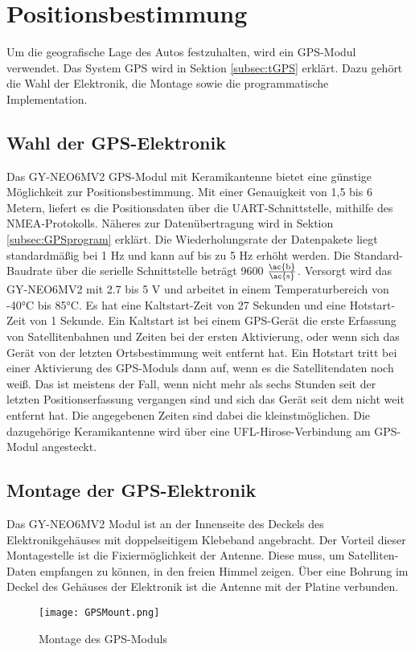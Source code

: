 \section{Positionsbestimmung}
\label{sec:GPS}
Um die geografische Lage des Autos festzuhalten, wird ein \ac{GPS}-Modul verwendet. Das System \ac{GPS} wird in Sektion \ref{subsec:tGPS} erklärt. Dazu gehört die Wahl der Elektronik, die Montage sowie die programmatische Implementation.

\subsection{Wahl der GPS-Elektronik}
\label{subsec:GPSchoice}
Das GY-NEO6MV2 \ac{GPS}-Modul mit Keramikantenne bietet eine günstige Möglichkeit zur Positionsbestimmung. Mit einer Genauigkeit von 1,5 bis 6 Metern, liefert es die Positionsdaten über die \ac{UART}-Schnittstelle, mithilfe des \ac{NMEA}-Protokolls. Näheres zur Datenübertragung wird in Sektion \ref{subsec:GPSprogram} erklärt. Die Wiederholungsrate der Datenpakete liegt standardmäßig bei 1 \ac{Hz} und kann auf bis zu 5 \ac{Hz} erhöht werden. Die Standard-Baudrate über die serielle Schnittstelle beträgt 9600 $\frac{\mathrm{\ac{b}}}{\mathrm{\ac{s}}}$. Versorgt wird das GY-NEO6MV2 mit 2.7 bis 5 V und arbeitet in einem Temperaturbereich von -40°C bis 85°C. Es hat eine Kaltstart-Zeit von 27 Sekunden und eine Hotstart-Zeit von 1 Sekunde. Ein Kaltstart ist bei einem GPS-Gerät die erste Erfassung von Satellitenbahnen und Zeiten bei der ersten Aktivierung, oder wenn sich das Gerät von der letzten Ortsbestimmung weit entfernt hat. Ein Hotstart tritt bei einer Aktivierung des GPS-Moduls dann auf, wenn es die Satellitendaten noch weiß. Das ist meistens der Fall, wenn nicht mehr als sechs Stunden seit der letzten Positionserfassung vergangen sind und sich das Gerät seit dem nicht weit entfernt hat. Die angegebenen Zeiten sind dabei die kleinstmöglichen. Die dazugehörige Keramikantenne wird über eine UFL-Hirose-Verbindung am GPS-Modul angesteckt. 

\subsection{Montage der GPS-Elektronik}
\label{subsec:GPSmount}
Das GY-NEO6MV2 Modul ist an der Innenseite des Deckels des Elektronikgehäuses mit doppelseitigem Klebeband angebracht. Der Vorteil dieser Montagestelle ist die Fixiermöglichkeit der Antenne. Diese muss, um Satelliten-Daten empfangen zu können, in den freien Himmel zeigen. Über eine Bohrung im Deckel des Gehäuses der Elektronik ist die Antenne mit der Platine verbunden.
\newpage
\begin{figure}[h]
\centering
\texttt{[image: GPSMount.png]}
\caption{Montage des \ac{GPS}-Moduls}
\label{fig:GPSMount}
\end{figure}

